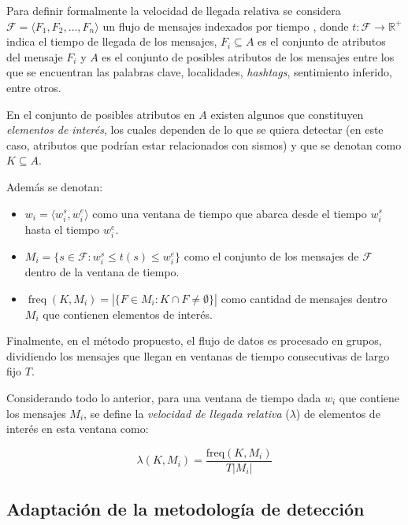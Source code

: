 Para definir formalmente la velocidad de llegada relativa se considera ${\mathcal F} = \langle F_1, F_2, \dots, F_n \rangle$ un flujo de mensajes indexados por tiempo , donde  $t: {\mathcal F} \rightarrow \mathbb{R}^+$ indica el tiempo de llegada de los mensajes, $F_i \subseteq A$ es el conjunto de atributos del mensaje $F_i$ y $A$ es el conjunto de posibles atributos de los mensajes entre los que se encuentran las palabras clave, localidades, \textit{hashtags}, sentimiento inferido, entre otros.  

En el conjunto de posibles atributos en $A$ existen algunos que constituyen \emph{elementos de interés}, los cuales dependen de lo que se quiera detectar (en este caso, atributos que podrían estar relacionados con sismos) y que se denotan como $K \subseteq A$.

Además se denotan:
\begin{itemize}
	\item $w_i = \langle w^s_i, w^e_i \rangle$ como una ventana de tiempo que abarca desde el tiempo $w^s_i$ hasta el tiempo $w^e_i$.
 	\item $M_i = \{ s \in {\mathcal F}: w^s_i \le t(s) \le w^e_i \}$ como el conjunto de los mensajes de ${\mathcal F}$ dentro de la ventana de tiempo. 
	\item $\operatorname{freq}(K, M_i) = | \{ F \in M_i: K \cap F \neq \emptyset \} |$ como cantidad de mensajes dentro $M_i$ que contienen elementos de interés.
\end{itemize}

Finalmente, en el método propuesto, el flujo de datos es procesado en grupos, dividiendo los mensajes que llegan en ventanas de tiempo consecutivas de largo fijo $T$.

Considerando todo lo anterior, para una ventana de tiempo dada $w_i$ que contiene los mensajes $M_i$, se define la \emph{velocidad de llegada relativa} ($\lambda$) de elementos de interés en esta ventana como:

\begin{equation}
\label{eq:lambda}
\lambda(K, M_i) = \frac{\mathrm{freq}(K,M_i)}{T|M_i|}
\end{equation}

\subsection{Adaptación de la metodología de detección}


